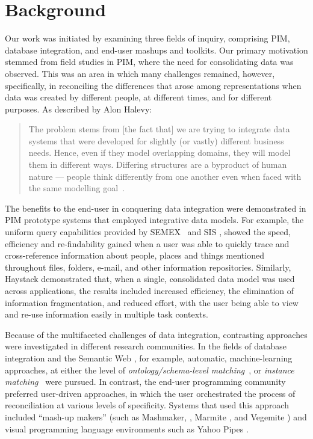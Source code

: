 \documentclass{sigchi}
\begin{document}
\section{Background}
Our work was initiated by examining three fields of inquiry, comprising PIM, database integration, and end-user mashups and toolkits.  Our primary motivation stemmed from field studies in PIM, where the need for consolidating data was observed.  This was an area in which many challenges remained, however, specifically, in reconciling the differences that arose among representations when data was created by different people, at different times, and for different purposes. As described by Alon Halevy:

\begin{quote} 
The problem stems from [the fact that] we are trying to integrate data systems that were developed for slightly (or vastly) different business needs. Hence, even if they model overlapping domains, they will model them in different ways. Differing structures are a byproduct of human nature --- people think differently from one another even when faced with the same modelling goal~\cite{halevy2006data}.
\end{quote}

The benefits to the end-user in conquering data integration were demonstrated in PIM prototype systems that employed integrative data models.  For example, the uniform query capabilities provided by SEMEX~\cite{semex} and SIS \cite{Dumais:2003:SIS:860435.860451}, showed the speed, efficiency and re-findability gained when a user was able to quickly trace and cross-reference information about people, places and things mentioned throughout files, folders, e-mail, and other information repositories.  Similarly, Haystack \cite{haystack} demonstrated that, when a single, consolidated data model was used across applications, the results included increased efficiency, the elimination of information fragmentation, and reduced effort, with the user being able to view and re-use information easily in multiple task contexts. 

Because of the multifaceted challenges of data integration, contrasting approaches were investigated in different research communities. In the fields of database integration and the Semantic Web \cite{Shadbolt:2006:SWR:1155313.1155373}, for example, automatic, machine-learning approaches, at either the level of \emph{ontology/schema-level matching}~\cite{euzenat2004api,doan2003learning}, or \emph{instance matching}~\cite{suchanek2011paris,castano2006matching} were pursued.   In contrast, the end-user programming community preferred user-driven approaches, in which the user orchestrated the process of reconciliation at various levels of specificity.  Systems that used this approach included ``mash-up makers'' (such as Mashmaker, \cite{intel_mashmaker}, Marmite \cite{Lin:2009:EPM:1502650.1502667}, and Vegemite \cite{Wong:2007:MMM:1240624.1240842}) and visual programming language environments such as Yahoo Pipes \cite{citeulike:8887891}.
\end{document}
